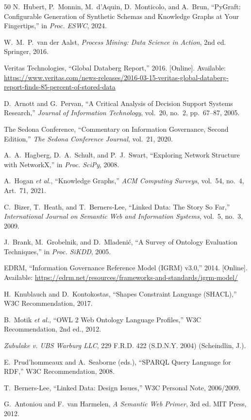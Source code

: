 \documentclass{ieeeaccess}
\begin{document}
\begin{thebibliography}{50}
N.~Hubert, P.~Monnin, M.~d'Aquin, D.~Monticolo, and A.~Brun, ``PyGraft: Configurable Generation of Synthetic Schemas and Knowledge Graphs at Your Fingertips,'' in \textit{Proc. ESWC}, 2024.

W.~M.~P.~van der Aalst, \textit{Process Mining: Data Science in Action}, 2nd ed. Springer, 2016.

Veritas Technologies, ``Global Databerg Report,'' 2016. [Online]. Available: \url{https://www.veritas.com/news-releases/2016-03-15-veritas-global-databerg-report-finds-85-percent-of-stored-data}

D.~Arnott and G.~Pervan, ``A Critical Analysis of Decision Support Systems Research,'' \textit{Journal of Information Technology}, vol.~20, no.~2, pp.~67--87, 2005.

The Sedona Conference, ``Commentary on Information Governance, Second Edition,'' \textit{The Sedona Conference Journal}, vol.~21, 2020.

A.~A.~Hagberg, D.~A.~Schult, and P.~J.~Swart, ``Exploring Network Structure with NetworkX,'' in \textit{Proc. SciPy}, 2008.

A.~Hogan \textit{et al.}, ``Knowledge Graphs,'' \textit{ACM Computing Surveys}, vol.~54, no.~4, Art.~71, 2021.

C.~Bizer, T.~Heath, and T.~Berners-Lee, ``Linked Data: The Story So Far,'' \textit{International Journal on Semantic Web and Information Systems}, vol.~5, no.~3, 2009.

J.~Brank, M.~Grobelnik, and D.~Mladeni\'{c}, ``A Survey of Ontology Evaluation Techniques,'' in \textit{Proc. SiKDD}, 2005.

EDRM, ``Information Governance Reference Model (IGRM) v3.0,'' 2014. [Online]. Available: \url{https://edrm.net/resources/frameworks-and-standards/igrm-model/}

H.~Knublauch and D.~Kontokostas, ``Shapes Constraint Language (SHACL),'' W3C Recommendation, 2017.

B.~Motik \textit{et al.}, ``OWL 2 Web Ontology Language Profiles,'' W3C Recommendation, 2nd ed., 2012.

\textit{Zubulake v. UBS Warburg LLC}, 229 F.R.D. 422 (S.D.N.Y. 2004) (Scheindlin, J.).

E.~Prud'hommeaux and A.~Seaborne (eds.), ``SPARQL Query Language for RDF,'' W3C Recommendation, 2008.

T.~Berners-Lee, ``Linked Data: Design Issues,'' W3C Personal Note, 2006/2009.

G.~Antoniou and F.~van Harmelen, \textit{A Semantic Web Primer}, 3rd ed. MIT Press, 2012.

\end{thebibliography}
\end{document}
